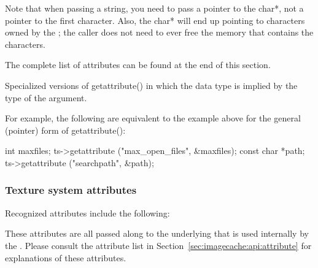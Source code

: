 Note that when passing a string, you need to pass a pointer to the {\cf
  char*}, not a pointer to the first character.  Also, the {\cf char*}
will end up pointing to characters owned by the \TextureSystem; the
caller does not need to ever free the memory that contains the
characters.

The complete list of attributes can be found at the end of this section.


\apiend

Specialized versions of {\cf getattribute()} in which the data type is
implied by the type of the argument.

For example, the following are equivalent to the example above for the
general (pointer) form of {\cf getattribute()}:

\begin{code}
      int maxfiles;
      ts->getattribute ("max_open_files", &maxfiles);
      const char *path;
      ts->getattribute ("searchpath", &path);
\end{code}

\apiend


\subsubsection*{Texture system attributes}

Recognized attributes include the following:


These attributes are all passed along to the underlying \ImageCache that
is used internally by the \TextureSystem.  Please consult the
\ImageCache attribute list in Section~\ref{sec:imagecache:api:attribute}
for explanations of these attributes.

